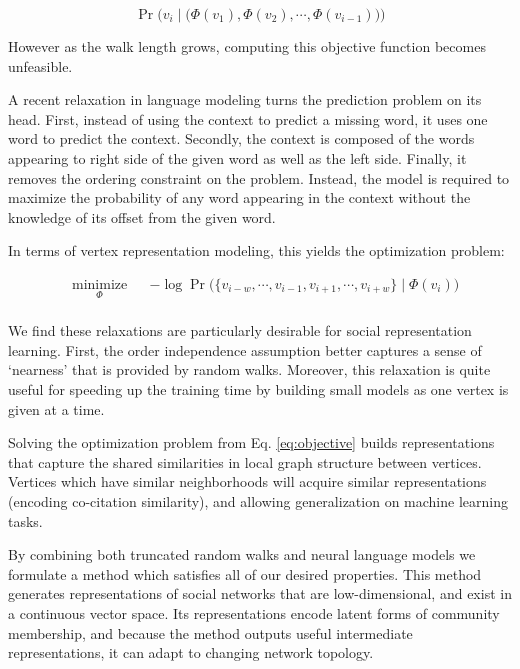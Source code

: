 \documentclass{sig-alternate}
\begin{document}
\begin{equation}
\Pr\Big(v_i \mid \big(\Phi(v_1), \Phi(v_2), \cdots, \Phi(v_{i-1})\big)\Big)
\end{equation}


However as the walk length grows, computing this objective function becomes unfeasible.

A recent relaxation in language modeling \cite{word2vec1,word2vec2} turns the prediction problem on its head.
First, instead of using the context to predict a missing word, it uses one word to predict the context.
Secondly, the context is composed of the words appearing to right side of the given word as well as the left side.
Finally, it removes the ordering constraint on the problem.
Instead, the model is required to maximize the probability of any word appearing in the context without the knowledge of its offset from the given word.


In terms of vertex representation modeling, this yields the optimization problem:


\begin{equation}
\begin{aligned}
& \underset{\Phi}{\text{minimize}}
& & -\log \Pr\big(\{v_{i-w}, \cdots, v_{i-1}, v_{i+1}, \cdots, v_{i+w}\}\mid \Phi(v_i) \big) \\
\end{aligned}
\label{eq:objective}
\end{equation}

We find these relaxations are particularly desirable for social representation learning.
First, the order independence assumption better captures a sense of `nearness' that is provided by random walks.
Moreover, this relaxation is quite useful for speeding up the training time by building small models as one vertex is given at a time.

Solving the optimization problem from Eq. \ref{eq:objective} builds representations that capture the shared similarities in local graph structure between vertices.
Vertices which have similar neighborhoods will acquire similar representations (encoding co-citation similarity), and allowing generalization on machine learning tasks.


By combining both truncated random walks and neural language models we formulate a method which satisfies all of our desired properties.
This method generates representations of social networks that are low-dimensional, and exist in a continuous vector space.
Its representations encode latent forms of community membership, and because the method outputs useful intermediate representations, it can adapt to changing network topology.
\end{document}
